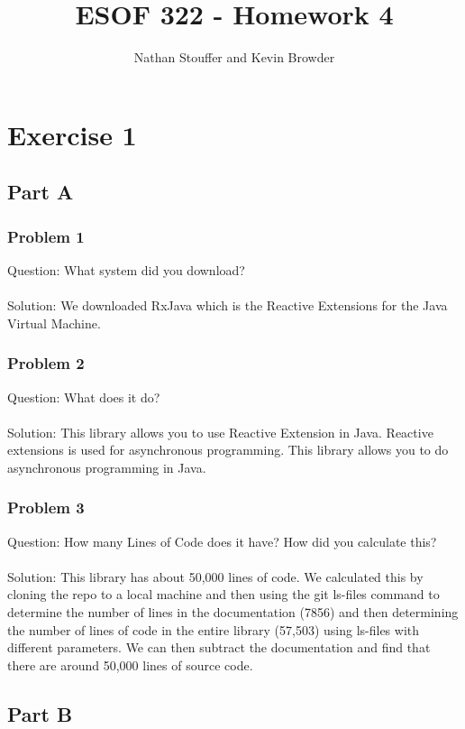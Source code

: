 \documentclass{article}
\begin{document}
	
\title{ESOF 322 - Homework 4}
\author{Nathan Stouffer and Kevin Browder}

\maketitle
\newpage

\section*{Exercise 1}

\subsection*{Part A}
\subsubsection*{Problem 1}
Question: What system did you download?\\\\
Solution: We downloaded RxJava which is the Reactive Extensions for the Java Virtual Machine.

\subsubsection*{Problem 2}
Question: What does it do?\\\\
Solution: This library allows you to use Reactive Extension in Java. Reactive extensions is used for asynchronous programming. This library allows you to do asynchronous programming in Java.

\subsubsection*{Problem 3}
Question: How many Lines of Code does it have? How did you calculate this?\\\\
Solution: This library has about 50,000 lines of code. We calculated this by cloning the repo to a local machine and then using the git ls-files command to determine the number of lines in the documentation (7856) and then determining the number of lines of code in the entire library (57,503) using ls-files with different parameters. We can then subtract the documentation and find that there are around 50,000 lines of source code.

\subsection*{Part B}
\end{document}
